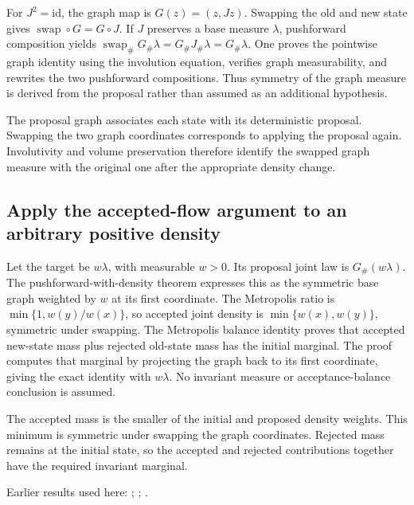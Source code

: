 \documentclass[11pt,a4paper]{report}
\begin{document}
For \(J^2=\mathrm{id}\), the graph map is \(G(z)=(z,Jz)\). Swapping the old and new state gives \(\operatorname{swap}\circ G=G\circ J\). If \(J\) preserves a base measure \(\lambda\), pushforward composition yields \(\operatorname{swap}_\#G_\#\lambda=G_\#J_\#\lambda=G_\#\lambda\). One proves the pointwise graph identity using the involution equation, verifies graph measurability, and rewrites the two pushforward compositions. Thus symmetry of the graph measure is derived from the proposal rather than assumed as an additional hypothesis.



The proposal graph associates each state with its deterministic proposal. Swapping the two graph coordinates corresponds to applying the proposal again. Involutivity and volume preservation therefore identify the swapped graph measure with the original one after the appropriate density change.

\subsection{\texorpdfstring{Apply the accepted-flow argument to an arbitrary positive density}{Apply the accepted-flow argument to an arbitrary positive density}}
\label{report-step-KineticLangevin-HamiltonianMetropolis-lean-2}


Let the target be \(w\lambda\), with measurable \(w>0\). Its proposal joint law is \(G_\#(w\lambda)\). The pushforward-with-density theorem expresses this as the symmetric base graph weighted by \(w\) at its first coordinate. The Metropolis ratio is \(\min\{1,w(y)/w(x)\}\), so accepted joint density is \(\min\{w(x),w(y)\}\), symmetric under swapping. The Metropolis balance identity proves that accepted new-state mass plus rejected old-state mass has the initial marginal. The proof computes that marginal by projecting the graph back to its first coordinate, giving the exact identity with \(w\lambda\). No invariant measure or acceptance-balance conclusion is assumed.



The accepted mass is the smaller of the initial and proposed density weights. This minimum is symmetric under swapping the graph coordinates. Rejected mass remains at the initial state, so the accepted and rejected contributions together have the required invariant marginal.



Earlier results used here: \cite[Section~3.35.12]{LangevinLean2026ULASC}; \cite[Section~3.35.3]{LangevinLean2026ULASC}; \cite[Section~3.35.7]{LangevinLean2026ULASC}.
\end{document}
